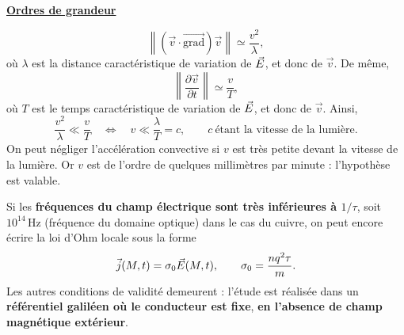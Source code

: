 \documentclass[11pt,a4paper]{article}
\newif\ifinexample
\newcommand{\vv}{\vec v}
\newcommand{\grad}{\overrightarrow{\mathrm{grad}}}
\newcommand{\titr}[1]{\par\ifinexample\else\Needspace{4\baselineskip}\fi\textbf{\underline{#1}}\par\nopagebreak[3]}
\newcommand{\vj}{\vec j}\newcommand{\vE}{\vec E}\newcommand{\vB}{\vec B}
\newcommand{\norme}[1]{\left\lVert #1\right\rVert}
\newcommand{\unite}[1]{\,\mathrm{#1}}
\begin{document}
\titr{Ordres de grandeur}
\[
 \norme{(\vv\cdot\grad)\vv}\simeq\frac{v^2}{\lambda},
\]
où \(\lambda\) est la distance caractéristique de variation de \(\vec E\), et donc de \(\vv\).
De même,
\[
 \norme{\frac{\partial\vv}{\partial t}}\simeq\frac vT,
\]
où \(T\) est le temps caractéristique de variation de \(\vec E\), et donc de \(\vv\). Ainsi,
\[
 \frac{v^2}{\lambda}\ll\frac vT
 \quad\Longleftrightarrow\quad
 v\ll\frac{\lambda}{T}=c,\qquad c\ \text{étant la vitesse de la lumière}.
\]\label{verif:lambda}
On peut négliger l'accélération convective si \(v\) est très petite devant la vitesse de la
lumière. Or \(v\) est de l'ordre de quelques millimètres par minute : l'hypothèse est valable.

\begin{cadre}
Si les \textbf{fréquences du champ électrique sont très inférieures à \(1/\tau\)}, soit
\(10^{14}\unite{Hz}\) (fréquence du domaine optique) dans le cas du cuivre, on peut encore
écrire la loi d'Ohm locale sous la forme
\[
 \vj(M,t)=\sigma_0\E(M,t),\qquad \sigma_0=\frac{nq^2\tau}{m}.
\]
Les autres conditions de validité demeurent : l'étude est réalisée dans un \textbf{référentiel
galiléen où le conducteur est fixe}, \textbf{en l'absence de champ magnétique extérieur}.
\end{cadre}
\end{document}
